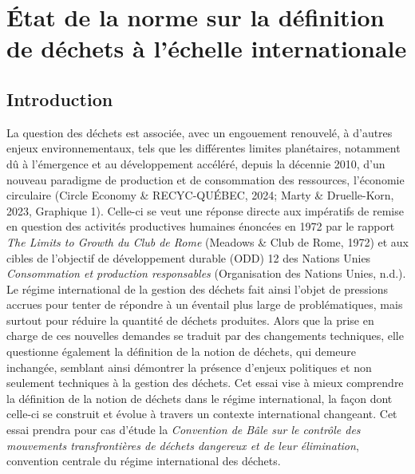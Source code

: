 \documentclass[12pt]{ulaval}
\date{Décembre 2024}
\begin{document}
  \maketitle

\frontmatter %
\pagestyle{plain} %
\setcounter{page}{2}



% 
  \hypersetup{linkcolor=black}
   \setcounter{tocdepth}{2}
  \tableofcontents

  \listoftables

  \listoffigures


% 
\mainmatter %
\pagestyle{fancyplain} %

\doublespace

\chapter{État de la norme sur la définition de déchets à l'échelle internationale}\label{uxe9tat-de-la-norme-sur-la-duxe9finition-de-duxe9chets-uxe0-luxe9chelle-internationale}

\section{Introduction}\label{introduction}

La question des déchets est associée, avec un engouement renouvelé, à d'autres enjeux environnementaux, tels que les différentes limites planétaires, notamment dû à l'émergence et au développement accéléré, depuis la décennie 2010, d'un nouveau paradigme de production et de consommation des ressources, l'économie circulaire (Circle Economy \& RECYC-QUÉBEC, 2024; Marty \& Druelle-Korn, 2023, Graphique 1). Celle-ci se veut une réponse directe aux impératifs de remise en question des activités productives humaines énoncées en 1972 par le rapport \emph{The Limits to Growth du Club de Rome} (Meadows \& Club de Rome, 1972) et aux cibles de l'objectif de développement durable (ODD) 12 des Nations Unies \emph{Consommation et production responsables} (Organisation des Nations Unies, n.d.). Le régime international de la gestion des déchets fait ainsi l'objet de pressions accrues pour tenter de répondre à un éventail plus large de problématiques, mais surtout pour réduire la quantité de déchets produites. Alors que la prise en charge de ces nouvelles demandes se traduit par des changements techniques, elle questionne également la définition de la notion de déchets, qui demeure inchangée, semblant ainsi démontrer la présence d'enjeux politiques et non seulement techniques à la gestion des déchets. Cet essai vise à mieux comprendre la définition de la notion de déchets dans le régime international, la façon dont celle-ci se construit et évolue à travers un contexte international changeant. Cet essai prendra pour cas d'étude la \emph{Convention de Bâle sur le contrôle des mouvements transfrontières de déchets dangereux et de leur élimination}, convention centrale du régime international des déchets.
\end{document}
